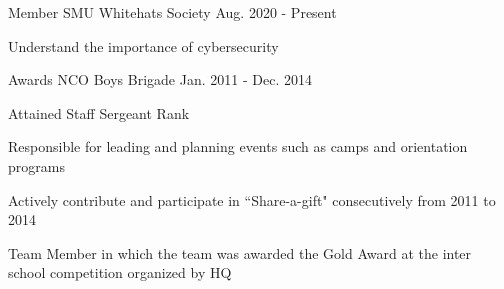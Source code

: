 \begin{cventries}
    \cventry
    {Member} %
    {SMU Whitehats Society} %
    {Aug. 2020 - Present} %
    {} 
    {
      \begin{cvitems} %
        \item {Understand the importance of cybersecurity}
      \end{cvitems}
    }

    \cventry
    {Awards NCO} %
    {Boys Brigade} %
    {Jan. 2011 - Dec. 2014} %
    {} 
    {
      \begin{cvitems} %
        \item {Attained Staff Sergeant Rank}
        \item {Responsible for leading and planning events such as camps and orientation programs}
        \item {Actively contribute and participate in “Share-a-gift" consecutively from 2011 to 2014}
        \item {Team Member in which the team was awarded the Gold Award at the inter school competition organized by HQ}
      \end{cvitems}
    }

\end{cventries}
